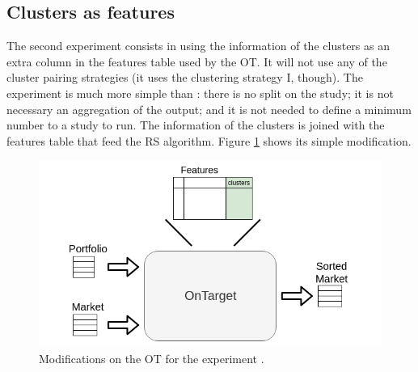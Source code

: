 \subsection{Clusters as features}

The second experiment consists in using the information of the clusters as an extra column in the features table used by the OT. It will not use any of the cluster pairing strategies (it uses the clustering strategy I, though). The experiment \nameExperimentII{} is much more simple than \nameExperimentI{}: there is no split on the study; it is not necessary an aggregation of the output; and it is not needed to define a minimum number to a study to run. The information of the clusters is joined with the features table that feed the RS algorithm. Figure \ref{fig:clusters-as-features} shows its simple modification.

\begin{figure}[H]
   \centering
   \includegraphics[width=\linewidth]{fig/ch3-clusters-as-features.png}
   \caption{Modifications on the OT for the experiment \nameExperimentII{}.}
   \label{fig:clusters-as-features}
\end{figure}